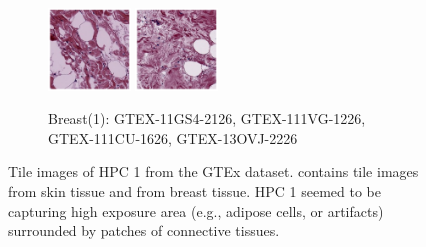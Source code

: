 \documentclass{l4proj}
\begin{document}
\begin{figure}[t]
\begin{subfigure}[b]{\textwidth}
        \includegraphics[width=0.24\textwidth]{images/breast1_3.png}
        \includegraphics[width=0.24\textwidth]{images/breast1_4.png}
        \caption{Breast(1): GTEX-11GS4-2126, GTEX-111VG-1226, GTEX-111CU-1626, GTEX-13OVJ-2226}
        \label{fig:breast1}
    \end{subfigure}
    \caption{Tile images of HPC 1 from the GTEx dataset.  contains tile images from skin tissue and  from breast tissue. HPC 1 seemed to be capturing high exposure area (e.g., adipose cells, or artifacts) surrounded by patches of connective tissues. 
    }\label{fig:hpc1}
\end{figure}
\end{document}
